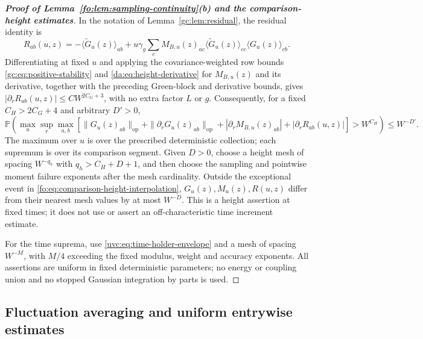 \documentclass[11pt]{article}
\numberwithin{equation}{section}
\theoremstyle{remark}
\newcommand{\Prob}{\mathbb P}
\newcommand{\wt}{\widetilde}
\newcommand{\op}{\mathrm{op}}
\begin{document}
\begin{proof}[\textbf{Proof of Lemma~\ref{fo:lem:sampling-continuity}(b) and the comparison-height estimates}]
In the notation of Lemma~\ref{gc:lem:residual}, the residual identity is
\[
 R_{ab}(u,z)=-\langle\wt G_u(z)\rangle_{ab}
 +u\gamma_g\sum_cM_{B,u}(z)_{ac}
       \langle\wt G_u(z)\rangle_{cc}\langle G_u(z)\rangle_{cb}.
\]
Differentiating at fixed $u$ and applying the covariance-weighted row bounds
\eqref{gc:eq:positive-stability} and \eqref{da:eq:height-derivative} for
$M_{B,u}(z)$ and its derivative, together with the preceding Green-block
and derivative bounds, gives $|\partial_rR_{ab}(u,z)|\le CW^{2C_G+3}$,
with no extra factor $L$ or $g$.
Consequently, for a fixed $C_H>2C_G+4$ and arbitrary $D'>0$,
\begin{equation}\label{fo:eq:comparison-height-interpolation}
 \Prob\!\left(\max_{u}\sup_{r}\max_{a,b}
 \left[\|G_u(z)_{ab}\|_{\op}+\|\partial_rG_u(z)_{ab}\|_{\op}
       +|\partial_rM_{B,u}(z)_{ab}|+|\partial_rR_{ab}(u,z)|\right]
       >W^{C_H}\right)\le W^{-D'}.
\end{equation}
The maximum over $u$ is over the prescribed deterministic collection;
each supremum is over its comparison segment. Given $D>0$, choose a
height mesh of spacing $W^{-q_h}$ with $q_h>C_H+D+1$, and then choose
the sampling and pointwise moment failure exponents after the mesh
cardinality. Outside the exceptional event in \eqref{fo:eq:comparison-height-interpolation},
$G_u(z),M_u(z),R(u,z)$ differ from their nearest mesh values by at most $W^{-D}$.
This is a height assertion at fixed times; it does not use or assert
an off-characteristic time increment estimate.

For the time suprema, use \eqref{uvc:eq:time-holder-envelope} and a
mesh of spacing $W^{-M}$, with $M/4$ exceeding the fixed modulus,
weight and accuracy exponents. All assertions are uniform in fixed
deterministic parameters; no energy or coupling union and no stopped
Gaussian integration by parts is used.
\end{proof}

\subsection{Fluctuation averaging and uniform entrywise estimates}
\label{app:uniform-continuation}\label{sec:input-averaging}
\end{document}
